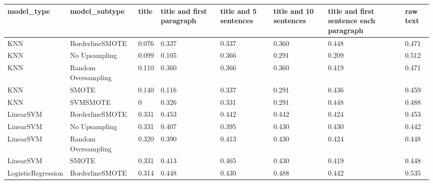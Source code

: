 \begin{tabular}{llllllll}
\toprule
                  model\_type &       model\_subtype &     title & title and first paragraph & title and 5 sentences & title and 10 sentences & title and first sentence each paragraph &  raw text \\
\midrule
                         KNN &     BorderlineSMOTE &     0.076 &                     0.337 &                 0.337 &                  0.360 &                                   0.448 &     0.471 \\
                         KNN &       No Upsampling &     0.099 &                     0.105 &                 0.366 &                  0.291 &                                   0.209 &     0.512 \\
                         KNN & Random Oversampling &     0.110 &                     0.360 &                 0.366 &                  0.360 &                                   0.419 &     0.471 \\
                         KNN &               SMOTE &     0.140 &                     0.116 &                 0.337 &                  0.291 &                                   0.436 &     0.459 \\
                         KNN &            SVMSMOTE &         0 &                     0.326 &                 0.331 &                  0.291 &                                   0.448 &     0.488 \\
                   LinearSVM &     BorderlineSMOTE &     0.331 &                     0.453 &                 0.442 &                  0.442 &                                   0.424 &     0.453 \\
                   LinearSVM &       No Upsampling &     0.331 &                     0.407 &                 0.395 &                  0.430 &                                   0.430 &     0.442 \\
                   LinearSVM & Random Oversampling &     0.320 &                     0.390 &                 0.413 &                  0.430 &                                   0.424 &     0.448 \\
                   LinearSVM &               SMOTE &     0.331 &                     0.413 &                 0.465 &                  0.430 &                                   0.419 &     0.448 \\
          LogisticRegression &     BorderlineSMOTE &     0.314 &                     0.448 &                 0.430 &                  0.488 &                                   0.442 &     0.535 \\

\end{tabular}

